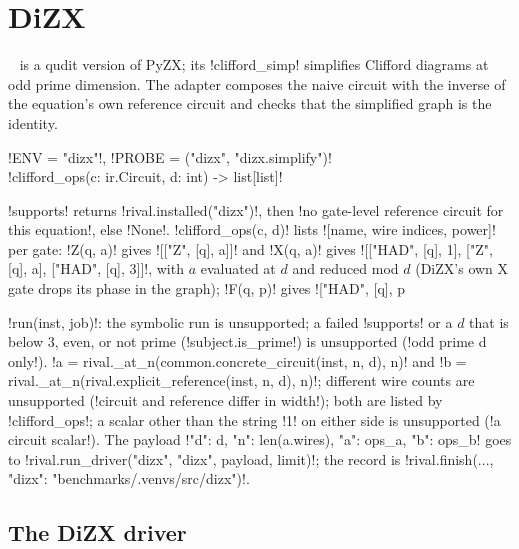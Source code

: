 \section{DiZX}\label{sec:bench-tools-dizx}

~\cite{dizx} is a qudit version of PyZX; its \code!clifford_simp! simplifies Clifford diagrams at odd prime dimension. The adapter composes the naive circuit with the inverse of the equation's own reference circuit and checks that the simplified graph is the identity.

\begin{signature}
\py!ENV = "dizx"!, \py!PROBE = ("dizx", "dizx.simplify")!\\
\py!clifford_ops(c: ir.Circuit, d: int) -> list[list]!
\end{signature}

\py!supports! returns \py!rival.installed("dizx")!, then \code!no gate-level reference circuit for this equation!, else \py!None!. \py!clifford_ops(c, d)! lists \py![name, wire indices, power]! per gate: \py!Z(q, a)! gives \py![["Z", [q], a]]! and \py!X(q, a)! gives \py![["HAD", [q], 1], ["Z", [q], a], ["HAD", [q], 3]]!, with $a$ evaluated at $d$ and reduced mod $d$ (DiZX's own X gate drops its phase in the graph); \py!F(q, p)! gives \py!["HAD", [q], p %

\py!run(inst, job)!: the symbolic run is unsupported; a failed \py!supports! or a $d$ that is below $3$, even, or not prime (\py!subject.is_prime!) is unsupported (\code!odd prime d only!). \py!a = rival._at_n(common.concrete_circuit(inst, n, d), n)! and \py!b = rival._at_n(rival.explicit_reference(inst, n, d), n)!; different wire counts are unsupported (\code!circuit and reference differ in width!); both are listed by \py!clifford_ops!; a scalar other than the string \code!1! on either side is unsupported (\code!a circuit scalar!). The payload \py!{"d": d, "n": len(a.wires), "a": ops_a, "b": ops_b}! goes to \py!rival.run_driver("dizx", "dizx", payload, limit)!; the record is \py!rival.finish(..., {"dizx": "benchmarks/.venvs/src/dizx"})!.

\subsection{The DiZX driver}

